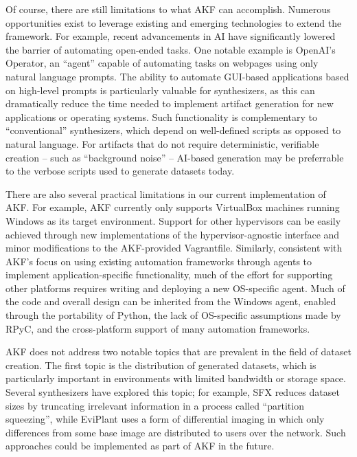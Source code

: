Of course, there are still limitations to what AKF can accomplish.
Numerous opportunities exist to leverage existing and emerging
technologies to extend the framework. For example, recent advancements
in AI have significantly lowered the barrier of automating open-ended
tasks. One notable example is OpenAI's Operator, an ``agent'' capable of
automating tasks on webpages using only natural language prompts. The
ability to automate GUI-based applications based on high-level prompts
is particularly valuable for synthesizers, as this can dramatically
reduce the time needed to implement artifact generation for new
applications or operating systems. Such functionality is complementary
to ``conventional'' synthesizers, which depend on well-defined scripts
as opposed to natural language. For artifacts that do not require
deterministic, verifiable creation -- such as ``background noise'' --
AI-based generation may be preferrable to the verbose scripts used to
generate datasets today.

There are also several practical limitations in our current
implementation of AKF. For example, AKF currently only supports
VirtualBox machines running Windows as its target environment. Support
for other hypervisors can be easily achieved through new implementations
of the hypervisor-agnostic interface and minor modifications to the
AKF-provided Vagrantfile. Similarly, consistent with AKF's focus on
using existing automation frameworks through agents to implement
application-specific functionality, much of the effort for supporting
other platforms requires writing and deploying a new OS-specific agent.
Much of the code and overall design can be inherited from the Windows
agent, enabled through the portability of Python, the lack of
OS-specific assumptions made by RPyC, and the cross-platform support of
many automation frameworks.

AKF does not address two notable topics that are prevalent in the field
of dataset creation. The first topic is the distribution of generated
datasets, which is particularly important in environments with limited
bandwidth or storage space. Several synthesizers have explored this
topic; for example, SFX \cite{russellForensicImageDescription2012}
reduces dataset sizes by truncating irrelevant information in a process
called ``partition squeezing'', while EviPlant
\cite{scanlonEviPlantEfficientDigital2017} uses a form of
differential imaging in which only differences from some base image are
distributed to users over the network. Such approaches could be
implemented as part of AKF in the future.

